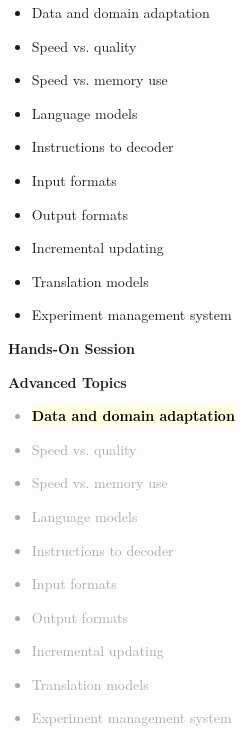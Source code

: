 \documentclass[landscape]{uedslides2C}
\newcommand{\currenttopic}[1]{\colorbox{lightyellow}{\textcolor{black}{\bf #1}}}
\begin{document}

\vspace{-5mm}
\begin{itemize} \itemsep -1mm
\item Data and domain adaptation
\item Speed vs. quality
\item Speed vs. memory use
\item Language models
\item Instructions to decoder
\item Input formats
\item Output formats
\item Incremental updating
\item Translation models
\item Experiment management system
\end{itemize}


\slide{}
\vspace{50mm}
\begin{center}
\Huge \bf Hands-On Session
\end{center}

\slide{}
\vspace{50mm}
\begin{center}
\Huge \bf Advanced Topics
\end{center}


\vspace{-5mm}
\textcolor{darkgrey}{
\begin{itemize} \itemsep -1mm
\item \currenttopic{Data and domain adaptation}
\item Speed vs. quality
\item Speed vs. memory use
\item Language models
\item Instructions to decoder
\item Input formats
\item Output formats
\item Incremental updating
\item Translation models
\item Experiment management system
\end{itemize}
}
\end{document}
